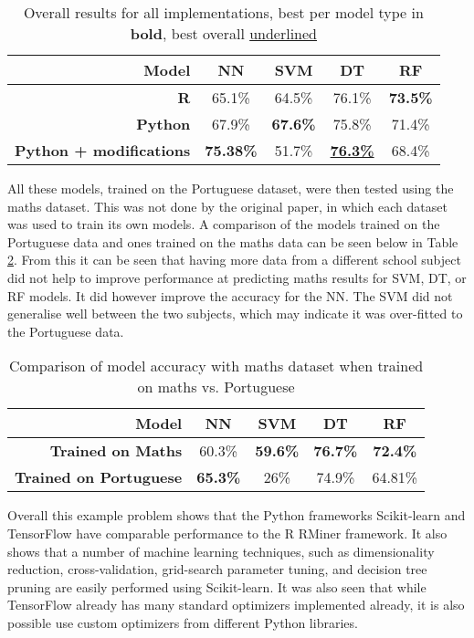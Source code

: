 \documentclass[12pt,a4paper,titlepage,twoside]{report}
\begin{document}
	\begin{table}[h]
		\centering
		\begin{tabular}{|r| c c c c|}
			\hline
			\textbf{Model}  					& NN				& SVM				& DT						 & RF		\\ \hline
			\textbf{R}	    					& 65.1\%			& 64.5\%			& 76.1\%					 & \textbf{73.5\%}	\\
			\textbf{Python}						& 67.9\%			& \textbf{67.6\%}	& 75.8\%					 & 71.4\%	\\
			\textbf{Python + modifications}		& \textbf{75.38\%}	& 51.7\%			& \textbf{\underline{76.3\%}}& 68.4\%	\\
			\hline
		\end{tabular}
		\caption{Overall results for all implementations, best per model type in \textbf{bold}, best overall \underline{underlined}}
		\label{tab:student-results-compare}
	\end{table}
	
	All these models, trained on the Portuguese dataset, were then tested using the maths dataset. This was not done by the original paper, in which each dataset was used to train its own models. A comparison of the models trained on the Portuguese data and ones trained on the maths data can be seen below in Table \ref{tab:student-maths}. From this it can be seen that having more data from a different school subject did not help to improve performance at predicting maths results for SVM, DT, or RF models. It did however improve the accuracy for the NN. The SVM did not generalise well between the two subjects, which may indicate it was over-fitted to the Portuguese data.
	
	\begin{table}
		\centering
		\begin{tabular}{|r| c c c c|}
			\hline
			\textbf{Model} 					& NN				& SVM				& DT				& RF				\\ \hline
			\textbf{Trained on Maths}		& 60.3\%			& \textbf{59.6\%}	& \textbf{76.7\%}	& \textbf{72.4\%}	\\
			\textbf{Trained on Portuguese}	& \textbf{65.3\%}	& 26\%				& 74.9\%			& 64.81\%			\\
			\hline
		\end{tabular}
		\caption{Comparison of model accuracy with maths dataset when trained on maths vs. Portuguese}
		\label{tab:student-maths}
	\end{table}

	Overall this example problem shows that the Python frameworks Scikit-learn and TensorFlow have comparable performance to the R RMiner framework. It also shows that a number of machine learning techniques, such as dimensionality reduction, cross-validation, grid-search parameter tuning, and decision tree pruning are easily performed using Scikit-learn. It was also seen that while TensorFlow already has many standard optimizers implemented already, it is also possible use custom optimizers from different Python libraries. 
\end{document}
